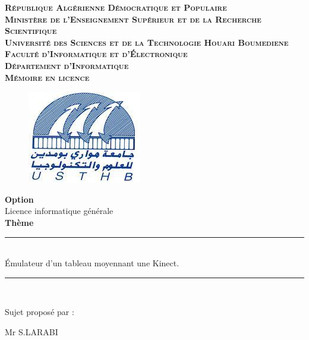 \documentclass[12pt,a4paper,oneside]{book}
\newcommand{\HRule}{\rule{\linewidth}{0.5mm}}
\begin{document}
	\begin{titlepage}
	
		\begin{center}
			\textsc{\Large \textbf{République Algérienne Démocratique et Populaire}\\[.20cm]
				\Large\textbf{ Ministère de l’Enseignement Supérieur et de la Recherche Scientifique} \\[.20cm]
				\Large \textbf{Université des Sciences et de la Technologie Houari Boumediene \\[.25cm]
					Faculté d'Informatique et d'Électronique \\[.25cm] 
					Département d'Informatique \\ Mémoire en licence }}
			\begin{figure}[h]
				\centering
				\includegraphics[scale=0.7]{USTHB.jpg}
			\end{figure}
			
			\Large \textbf{Option}\\ Licence informatique générale \\ \Large\textbf{Thème}
			
			\HRule \\[0.4cm]
			{ \huge \bfseries  }
			\LARGE Émulateur d'un tableau moyennant une Kinect. 
			\HRule \\[1.5cm]
		
			\begin{minipage}{0.5\textwidth}
				\begin{flushleft}
					Sujet proposé par :\\
					
					
					
				\end{flushleft}
				\begin{flushleft}\large
					Mr S.LARABI\\
				\end{flushleft}
				

\end{minipage}
\end{center}
\end{titlepage}
\end{document}
